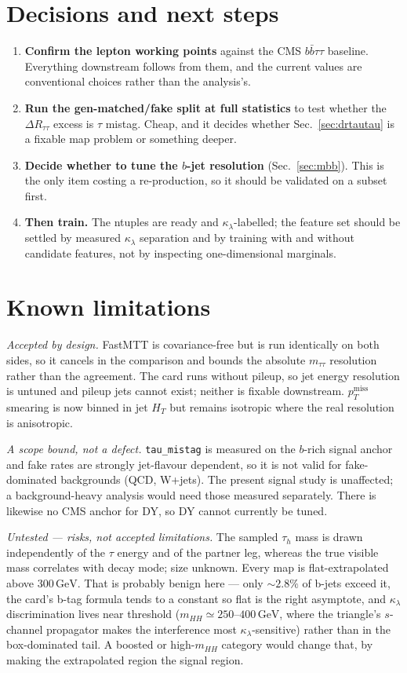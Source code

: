 \documentclass[11pt,a4paper]{article}
\newcommand{\tauh}{\tau_{h}}
\newcommand{\mtautau}{m_{\tau\tau}}
\newcommand{\kl}{\kappa_{\lambda}}
\newcommand{\dR}{\Delta R}
\newcommand{\ptmiss}{p_{T}^{\mathrm{miss}}}
\begin{document}
\section{Decisions and next steps}

\begin{enumerate}\itemsep2pt
\item \textbf{Confirm the lepton working points} against the CMS $b\bar b\tau\tau$ baseline.
      Everything downstream follows from them, and the current values are conventional
      choices rather than the analysis's.
\item \textbf{Run the gen-matched/fake split at full statistics} to test whether the
      $\dR_{\tau\tau}$ excess is $\tau$ mistag. Cheap, and it decides whether
      Sec.~\ref{sec:drtautau} is a fixable map problem or something deeper.
\item \textbf{Decide whether to tune the $b$-jet resolution} (Sec.~\ref{sec:mbb}). This is
      the only item costing a re-production, so it should be validated on a subset first.
\item \textbf{Then train.} The ntuples are ready and $\kl$-labelled; the feature set should
      be settled by measured $\kl$ separation and by training with and without candidate
      features, not by inspecting one-dimensional marginals.
\end{enumerate}

\section{Known limitations}

\emph{Accepted by design.} FastMTT is covariance-free but is run identically on both sides,
so it cancels in the comparison and bounds the absolute $\mtautau$ resolution rather than the
agreement. The card runs without pileup, so jet energy resolution is untuned and pileup jets
cannot exist; neither is fixable downstream. $\ptmiss$ smearing is now binned in jet $H_{T}$
but remains isotropic where the real resolution is anisotropic.

\emph{A scope bound, not a defect.} \texttt{tau\_mistag} is measured on the $b$-rich signal
anchor and fake rates are strongly jet-flavour dependent, so it is not valid for
fake-dominated backgrounds (QCD, W+jets). The present signal study is unaffected; a
background-heavy analysis would need those measured separately. There is likewise no CMS
anchor for DY, so DY cannot currently be tuned.

\emph{Untested --- risks, not accepted limitations.} The sampled $\tauh$ mass is drawn
independently of the $\tau$ energy and of the partner leg, whereas the true visible mass
correlates with decay mode; size unknown. Every map is flat-extrapolated above
$300\,\si{\GeV}$. That is probably benign here --- only ${\sim}2.8\%$ of b-jets exceed it,
the card's b-tag formula tends to a constant so flat is the right asymptote, and $\kl$
discrimination lives near threshold ($m_{HH}\simeq250$--$400\,\si{\GeV}$, where the triangle's
$s$-channel propagator makes the interference most $\kl$-sensitive) rather than in the
box-dominated tail. A boosted or high-$m_{HH}$ category would change that, by making the
extrapolated region the signal region.
\end{document}
